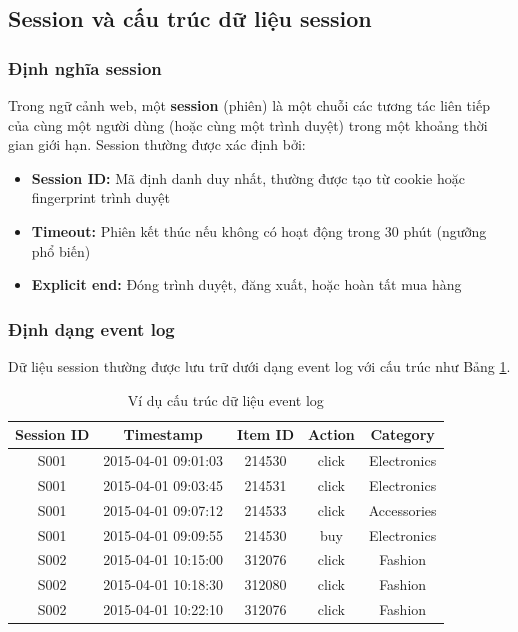 \documentclass[12pt, a4paper]{article}
\begin{document}
\subsection{Session và cấu trúc dữ liệu session}

\subsubsection{Định nghĩa session}

Trong ngữ cảnh web, một \textbf{session} (phiên) là một chuỗi các tương tác liên tiếp của cùng một người dùng (hoặc cùng một trình duyệt) trong một khoảng thời gian giới hạn. Session thường được xác định bởi:

\begin{itemize}
    \item \textbf{Session ID:} Mã định danh duy nhất, thường được tạo từ cookie hoặc fingerprint trình duyệt
    \item \textbf{Timeout:} Phiên kết thúc nếu không có hoạt động trong 30 phút (ngưỡng phổ biến)
    \item \textbf{Explicit end:} Đóng trình duyệt, đăng xuất, hoặc hoàn tất mua hàng
\end{itemize}

\subsubsection{Định dạng event log}

Dữ liệu session thường được lưu trữ dưới dạng event log với cấu trúc như Bảng \ref{tab:event_log}.

\begin{table}[H]
\centering
\caption{Ví dụ cấu trúc dữ liệu event log}
\label{tab:event_log}
\begin{tabular}{ccccc}
\toprule
\textbf{Session ID} & \textbf{Timestamp} & \textbf{Item ID} & \textbf{Action} & \textbf{Category} \\
\midrule
S001 & 2015-04-01 09:01:03 & 214530 & click & Electronics \\
S001 & 2015-04-01 09:03:45 & 214531 & click & Electronics \\
S001 & 2015-04-01 09:07:12 & 214533 & click & Accessories \\
S001 & 2015-04-01 09:09:55 & 214530 & buy & Electronics \\
\midrule
S002 & 2015-04-01 10:15:00 & 312076 & click & Fashion \\
S002 & 2015-04-01 10:18:30 & 312080 & click & Fashion \\
S002 & 2015-04-01 10:22:10 & 312076 & click & Fashion \\
\bottomrule
\end{tabular}
\end{table}
\end{document}

